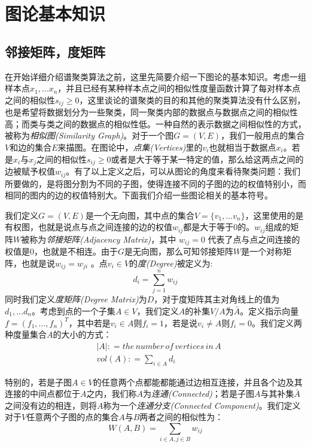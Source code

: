 \documentclass[UTF8, 12pt]{ctexart}
\begin{document}
\section{图论基本知识}
\subsection{邻接矩阵，度矩阵}
在开始详细介绍谱聚类算法之前，这里先简要介绍一下图论的基本知识。考虑一组样本点${x_1},...{x_n}$，并且已经有某种样本点之间的相似性度量函数计算了每对样本点之间的相似性${s_{ij}} \ge 0$，这里谈论的谱聚类的目的和其他的聚类算法没有什么区别，也是希望将数据划分为一些聚类，同一聚类内部的数据点与数据点之间的相似性高；而类与类之间的数据点的相似性低。一种自然的表示数据之间相似性的方式，被称为\emph{相似图(Similarity Graph)}。对于一个图$G=(V,E)$，我们一般用点的集合$V$和边的集合$E$来描图。在图论中，\emph{点集(Vertices)}里的${v_i}$也就相当于数据点${x_i}$。若是$x_{i}$与$x_{j}$之间的相似性${s_{ij}} \ge 0$或者是大于等于某一特定的值，那么给这两点之间的边被赋予权值${w_{ij}}$。有了以上定义之后，可以从图论的角度来看待聚类问题：我们所要做的，是将图分割为不同的子图，使得连接不同的子图的边的权值特别小，而相同的图内的边的权值特别大。下面我们介绍一些图论相关的基本符号。

我们定义$G=(V,E)$是一个无向图，其中点的集合$V = \{ {v_1},...{v_n}\}$，这里使用的是有权图，也就是说点与点之间连接的边的权值${w_{ij}}$都是大于等于0的。${w_{ij}}$组成的矩阵$W$被称为\emph{邻接矩阵(Adjacency Matrix)}，其中 ${w_{ij}} = 0$ 代表了点与点之间连接的权值是0，也就是不相连。由于$G$是无向图，那么可知邻接矩阵$W$是一个对称矩阵，也就是说${w_{ij}} = {w_{ji}}$ 。点${v_i} \in V$的\emph{度(Degree)}被定义为:
\begin{equation}
	{d_i} = \sum\limits_{j = 1}^n {{w_{ij}}}
\end{equation}
同时我们定义\emph{度矩阵(Degree Matrix)}为$D$，对于度矩阵其主对角线上的值为${d_1},...{d_n}$。考虑到点的一个子集$A \in V$，我们定义$A$的补集$V/A$为$\bar A$。定义指示向量$f = {({f_1},...,{f_n})^T}$，其中若是$v_i \in A$则$f_i=1$，若是说${v_i} \ne A$则$f_i=0$。我们定义两种度量集合$A$的大小的方式：
\begin{align}
	& |A|: = the\,number\,of\,vertices\,in\,A \\
	& vol(A): = \sum\limits_{i \in A} {{d_i}}
\end{align}

特别的，若是子图$A \in V$的任意两个点都能都能通过边相互连接，并且各个边及其连接的中间点都位于$A$之内，我们称$A$为\emph{连通(Connected)}；若是子图$A$与其补集$\bar A$之间没有边的相连，则将$A$称为一个\emph{连通分支(Connected Component)}。我们定义对于$V$任意两个子图的点的集合$A$与$B$两者之间的相似性为：
\begin{equation}
	W(A,B) = \sum\limits_{i \in A,j \in B} {{w_{ij}}}
\end{equation}
\end{document}
